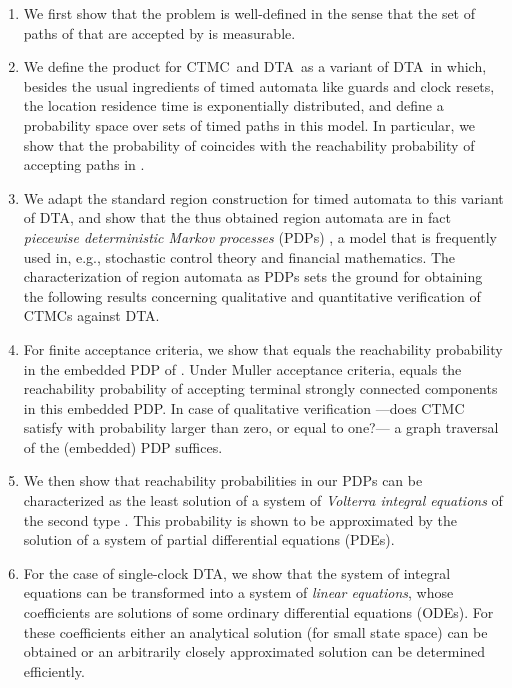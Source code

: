 \documentclass{LMCS}
\newcommand{\<}{\langle}
\renewcommand{\>}{\rangle}
\newcommand{\CTMC}{\textsc{{CTMC}}}
\newcommand{\DTA}{\textsc{DTA}}
\newcommand{\PDP}{\textsc{PDP}}
\begin{document}
\begin{enumerate}[(1)]
\item
We first show that the problem  is well-defined in the
sense that the set of paths of  that are accepted by  is measurable.
\item
We define the product  for \CTMC\  and \DTA\
 as a variant of \DTA\ in which, besides the usual ingredients of timed
automata like guards and clock resets, the location residence time is exponentially
distributed, and define a probability space over sets of timed paths in this model.
In particular, we show that the probability of  coincides with
the reachability probability of accepting paths in .
\item
We adapt the standard region construction for timed automata \cite{AD94} to this
variant of \DTA, and show that the thus obtained region automata are in fact \emph{piecewise deterministic Markov processes} (\PDP s) \cite{Dav93}, a model that is frequently
used in, e.g., stochastic control theory and financial mathematics.
The characterization of region automata as PDPs sets the ground for obtaining the
following results concerning qualitative and quantitative verification of CTMCs against
DTA.
\item
For finite acceptance criteria, we show that  equals the
reachability probability in the embedded PDP of .
Under Muller acceptance criteria,  equals the reachability
probability of accepting terminal strongly connected components in this embedded
PDP.
In case of qualitative verification ---does CTMC  satisfy  with probability
larger than zero, or equal to one?--- a graph traversal of the (embedded) PDP suffices.
\item
We then show that reachability probabilities in our PDPs can be characterized as the
least solution of a system of \emph{Volterra integral equations} of the second type
\cite{AWW95}.
This probability is shown to be approximated by the solution of a system of partial
differential equations (PDEs).
\item For the case of single-clock DTA, we show that the system of integral equations can be
transformed into a system of \emph{linear equations}, whose coefficients are solutions
of some ordinary differential equations (ODEs).
For these coefficients either an analytical solution (for small state space) can be obtained
or an arbitrarily closely approximated solution can be determined efficiently.
\end{enumerate}
\end{document}
